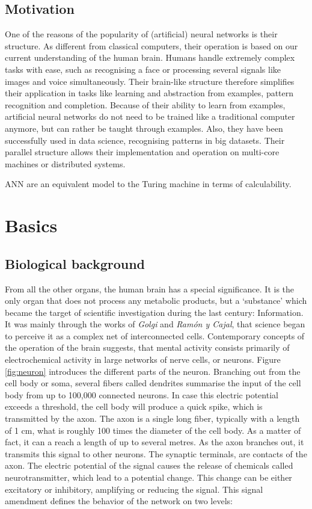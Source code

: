 \documentclass[10pt,a4paper,DIV=11]{scrreprt}
\begin{document}
\section{Motivation}
One of the reasons of the popularity of (artificial) neural networks is their structure. As different from classical computers, their operation is based on our current understanding of the human brain.  Humans handle extremely complex tasks with ease, such as recognising a face or processing several signals like images and voice simultaneously. Their brain-like structure therefore simplifies their application in tasks like learning and abstraction from examples, pattern recognition and completion. Because of their ability to learn from examples, artificial neural networks do not need to be trained like a traditional computer anymore, but can rather be taught through examples. Also, they have been successfully used in data science, recognising patterns in big datasets. Their parallel structure allows their implementation and operation on multi-core machines or distributed systems. 

ANN are an equivalent model to the Turing machine in terms of calculability.\cite{NURING}

\chapter{Basics}
\section{Biological background}
From all the other organs, the human brain has a special significance. It is the only organ that does not process any metabolic products, but a ‘substance’ which became the target of scientific investigation during the last century: Information. It was mainly through the works of \textit{Golgi} and \textit{Ramón y Cajal}, that science began to perceive it as a complex net of interconnected cells.  Contemporary concepts of the operation of the brain suggests, that mental activity consists primarily of electrochemical activity in large networks of nerve cells, or neurons. 
Figure \ref{fig:neuron} introduces the different parts of the neuron. Branching out from the cell body or soma, several fibers called dendrites summarise the input of the cell body from up to 100,000 connected neurons. In case this electric potential exceeds a threshold, the cell body will produce a quick spike, which is transmitted by the axon. The axon is a single long fiber, typically with a length of 1 cm, what is roughly 100 times the diameter of the cell body. As a matter of fact, it can a reach a length of up to several metres. As the axon branches out, it transmits this signal to other neurons. The synaptic terminals, are contacts of the axon. The electric potential of the signal causes the release of chemicals called neurotransmitter, which lead to a potential change. This change can be either excitatory or inhibitory, amplifying or reducing the signal. This signal amendment defines the behavior of the network on two levels: 
\end{document}
